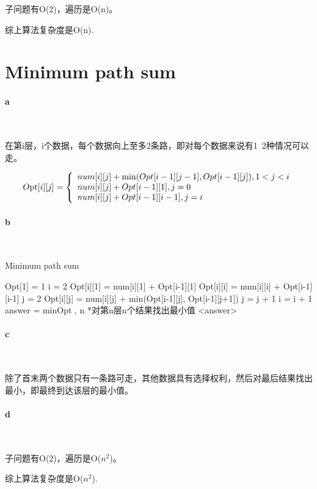 \documentclass{article}
\begin{document}
		子问题有O(2)，遍历是O(n)。
		
		综上算法复杂度是O(n).
	
	\newpage
	\section{Minimum path sum}
			\paragraph{a}\
	
			在第i层，i个数据，每个数据向上至多2条路，即对每个数据来说有1~2种情况可以走。

\[O{\rm{pt}}[i][j] = \left\{ {\begin{array}{*{20}{l}}
	{num[i][j] + \min (Opt[i - 1][j - 1],Opt[i - 1][j]) , 1 < j < i}\\
	{num[i][j] + Opt[i - 1][1] , j = 0}\\
	{num[i][j] + Opt[i - 1][i - 1] , j = i}
	\end{array}} \right.\]
	\paragraph{b}\
	\begin{algorithm}
		\caption{Minimum path sum}
		\begin{algorithmic}
			\State Opt[1] = 1
			\State i = 2
			\State Opt[i][1] = num[i][1] + Opt[i-1][1]
			\State Opt[i][i] = num[i][i] + Opt[i-1][i-1]
			\State j = 2
			\State Opt[i][j] = num[i][j] + min(Opt[i-1][j], Opt[i-1][j+1])
			\State j = j + 1
			\EndFor
			\State i = i + 1
			\EndFor
			\State  answer = min{Opt , n} *对第n层n个结果找出最小值
			\Return <answer>
			\EndProcedure
		\end{algorithmic}
	\end{algorithm}
	
	\paragraph{c}\
	
	除了首末两个数据只有一条路可走，其他数据具有选择权利，然后对最后结果找出最小，即最终到达该层的最小值。
	\paragraph{d}\
	
	子问题有O(2)，遍历是O($n^2$)。
	
	综上算法复杂度是O($n^2$).
			
\end{document}
